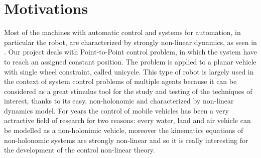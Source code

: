 \documentclass[a4paper,11pt,oneside]{book}
\begin{document}
\section*{Motivations}
Most of the machines with automatic control and systems for automation, in particular the robot, are characterized by strongly non-linear dynamics, as seen in \cite{MR-GB:11}. Our project deals with Point-to-Point control problem, in which the system have to reach an assigned constant position. The problem is applied to a planar vehicle with single wheel constraint, called unicycle. This type of robot is largely used in the context of system control problems of multiple agents because it can be considered as a great stimulus tool for the study and testing of the techniques of interest, thanks to its easy, non-holonomic and characterized by non-linear dynamics model. For years the control of mobile vehicles has been a very actractive field of research for two reasons: every water, land and air vehicle can be modelled as a non-holonimic vehicle, moreover the kinematics equations of non-holonomic systems are strongly non-linear and so it is really interesting for the development of the control non-linear theory.
\end{document}
